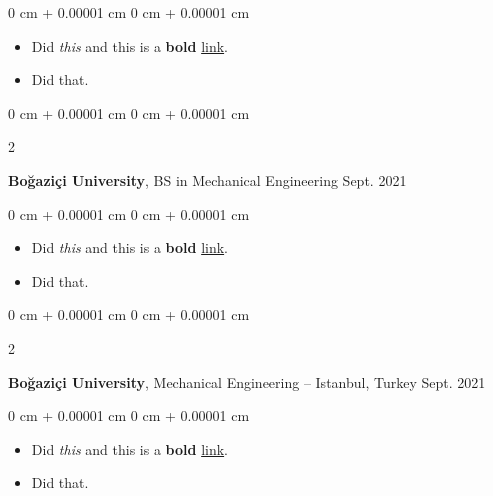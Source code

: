 \documentclass[10pt, letterpaper]{article}
\newenvironment{highlights}{
    \begin{itemize}[
        topsep=0.10 cm,
        parsep=0.10 cm,
        partopsep=0pt,
        itemsep=0pt,
        leftmargin=0 cm + 10pt
    ]
}{
    \end{itemize}
        
    \vspace{-0.10cm}
} %
\newenvironment{onecolentry}{
    \begin{adjustwidth}{
        0 cm + 0.00001 cm
    }{
        0 cm + 0.00001 cm
    }
}{
    \end{adjustwidth}
} %
\newenvironment{twocolentry}[2][]{
    \onecolentry
    \def\secondColumn{#2}
    \setcolumnwidth{\fill, 4.1 cm}
    \begin{paracol}{2}
}{
    \switchcolumn \raggedleft \secondColumn
    \end{paracol}
    \endonecolentry
} %
\begin{document}
        \vspace{0.10 cm}
        \begin{onecolentry}
            \begin{highlights}
                \item Did \textit{this} and this is a \textbf{bold} \href{https://example.com}{link}.
                \item Did that.
            \end{highlights}
        \end{onecolentry}


        \vspace{0.15 cm}

        \begin{twocolentry}{
            Sept. 2021
        }
            \textbf{Boğaziçi University}, BS in Mechanical Engineering\end{twocolentry}

        \vspace{0.10 cm}
        \begin{onecolentry}
            \begin{highlights}
                \item Did \textit{this} and this is a \textbf{bold} \href{https://example.com}{link}.
                \item Did that.
            \end{highlights}
        \end{onecolentry}


        \vspace{0.15 cm}

        \begin{twocolentry}{
            Sept. 2021
        }
            \textbf{Boğaziçi University}, Mechanical Engineering -- Istanbul, Turkey\end{twocolentry}

        \vspace{0.10 cm}
        \begin{onecolentry}
            \begin{highlights}
                \item Did \textit{this} and this is a \textbf{bold} \href{https://example.com}{link}.
                \item Did that.
            \end{highlights}
        \end{onecolentry}


        \vspace{0.15 cm}
\end{document}
